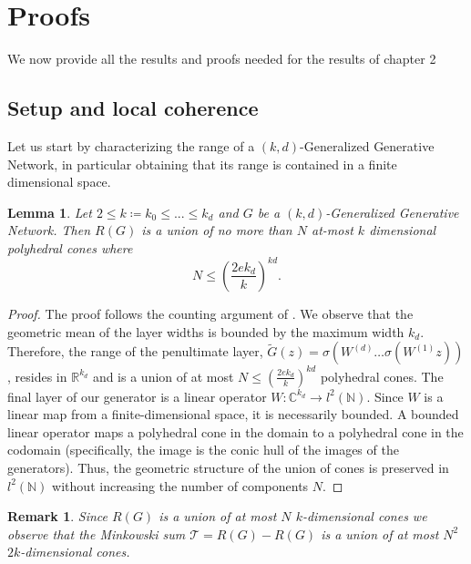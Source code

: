 \documentclass[a4paper,oneside]{amsart}
\newtheorem*{remark}{Remark}
\newtheorem{lemma}[theorem]{Lemma}
\newcommand{\lnn}{\ell^2(\mathbb{N})}
\begin{document}
\section{Proofs}\label{sec:proofs}
We now provide all the results and proofs needed for the results of chapter 2
\subsection{Setup and local coherence}
Let us start by characterizing the range of a $(k,d)$-Genera\-lized Generative Network, in particular obtaining that its range is contained in a finite dimensional space.
\begin{lemma}\label{lemma-sottospazi}
    Let $2\leq k \coloneqq k_0 \leq ... \leq k_d$ and $G$ be a $(k,d)$-Generalized Generative Network. Then $R(G)$ is a union of no more than $N$ at-most $k$ dimensional polyhedral cones where
    \begin{equation*}
        N \leq \left( \frac{2ek_d}{k} \right)^{kd}.
    \end{equation*}
\end{lemma}
     \begin{proof}
        The proof follows the counting argument of \cite[Lemma S2.2]{Berk22}.  We observe that the geometric mean of the layer widths is bounded by the maximum width $k_d$. Therefore, the range of the penultimate layer, $\tilde{G}(z) = \sigma(W^{(d)}\dots\sigma(W^{(1)}z))$, resides in $\mathbb{R}^{k_d}$ and is a union of at most $N\leq\left( \frac{2ek_d}{k} \right)^{kd}$ polyhedral cones. The final layer of our generator is a linear operator $W: \mathbb{C}^{k_d} \to l^2(\mathbb{N})$. Since $W$ is a linear map from a finite-dimensional space, it is necessarily bounded. A bounded linear operator maps a polyhedral cone in the domain to a polyhedral cone in the codomain (specifically, the image is the conic hull of the images of the generators). Thus, the geometric structure of the union of cones is preserved in $l^2(\mathbb{N})$ without increasing the number of components $N$.
    \end{proof}
\begin{remark}\label{remark-T}
    Since $R(G)$ is a union of at most $N$ $k$-dimensional cones we observe that the Minkowski sum $\mathcal{T} = R(G) - R(G) $ is a union of at most $N^2$ $2k$-dimensional cones.
\end{remark}
    
\end{document}
